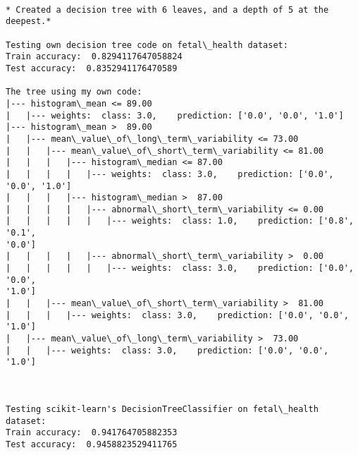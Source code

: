 \documentclass[11pt]{article}
\begin{document}
 
    \begin{Verbatim}[commandchars=\\\{\}]

* Created a decision tree with 6 leaves, and a depth of 5 at the deepest.*

Testing own decision tree code on fetal\_health dataset:
Train accuracy:  0.8294117647058824
Test accuracy:  0.8352941176470589

The tree using my own code:
|--- histogram\_mean <= 89.00
|   |--- weights:  class: 3.0,    prediction: ['0.0', '0.0', '1.0']
|--- histogram\_mean >  89.00
|   |--- mean\_value\_of\_long\_term\_variability <= 73.00
|   |   |--- mean\_value\_of\_short\_term\_variability <= 81.00
|   |   |   |--- histogram\_median <= 87.00
|   |   |   |   |--- weights:  class: 3.0,    prediction: ['0.0', '0.0', '1.0']
|   |   |   |--- histogram\_median >  87.00
|   |   |   |   |--- abnormal\_short\_term\_variability <= 0.00
|   |   |   |   |   |--- weights:  class: 1.0,    prediction: ['0.8', '0.1',
'0.0']
|   |   |   |   |--- abnormal\_short\_term\_variability >  0.00
|   |   |   |   |   |--- weights:  class: 3.0,    prediction: ['0.0', '0.0',
'1.0']
|   |   |--- mean\_value\_of\_short\_term\_variability >  81.00
|   |   |   |--- weights:  class: 3.0,    prediction: ['0.0', '0.0', '1.0']
|   |--- mean\_value\_of\_long\_term\_variability >  73.00
|   |   |--- weights:  class: 3.0,    prediction: ['0.0', '0.0', '1.0']



Testing scikit-learn's DecisionTreeClassifier on fetal\_health dataset:
Train accuracy:  0.941764705882353
Test accuracy:  0.9458823529411765
    \end{Verbatim}

    \begin{center}
    \end{center}
    { \hspace*{\fill} \\}
    
\end{document}
